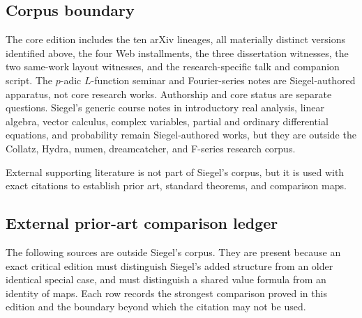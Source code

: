 \subsection{Corpus boundary}

The core edition includes the ten arXiv lineages, all materially distinct
versions identified above, the four Web installments, the three dissertation
witnesses, the two same-work layout witnesses, and the research-specific talk
and companion script.  The $p$-adic $L$-function seminar and Fourier-series
notes are Siegel-authored apparatus, not core research works.  Authorship and
core status are separate questions.  Siegel's generic
course notes in introductory real analysis, linear algebra, vector calculus,
complex variables, partial and ordinary differential equations, and
probability remain Siegel-authored works, but they are outside the Collatz,
Hydra, numen, dreamcatcher, and F-series research corpus.

External supporting literature is not part of Siegel's corpus, but it is used
with exact citations to establish prior art, standard theorems, and comparison
maps.

\subsection{External prior-art comparison ledger}

The following sources are outside Siegel's corpus.  They are present because
an exact critical edition must distinguish Siegel's added structure from an
older identical special case, and must distinguish a shared value formula
from an identity of maps.  Each row records the strongest comparison proved
in this edition and the boundary beyond which the citation may not be used.

